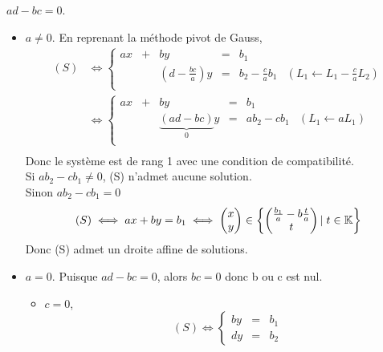 \documentclass{article}
\begin{document}
\begin{question_kholle}
		\item $ad - bc = 0$.
		\begin{itemize}[label=$\bullet$ Supposons]
			\item $a \neq 0$. En reprenant la méthode pivot de Gauss,
			\begin{equation*}
				\begin{aligned}
					(S)
					&\iff \left\{
					\begin{array}{cccccc}
						ax &+& by &=& b_1 \\
						&&\left(d - \frac{bc}{a}\right)y &=& b_2 - \frac{c}{a} b_1 &(L_1 \leftarrow L_1 - \frac{c}{a} L_2) \\
					\end{array}
					\right. \\
					&\iff \left\{
					\begin{array}{cccccc}
						ax &+& by &=& b_1 \\
						&& \underbrace{\left(ad - bc\right)}_0 y &=& a b_2 - c b_1 &(L_1 \leftarrow aL_1) \\
					\end{array}
					\right. \\
				\end{aligned}
			\end{equation*}
			Donc le système est de rang 1 avec une condition de compatibilité. \\
			Si $ab_2 - cb_1 \neq 0$, (S) n'admet aucune solution. \\
			Sinon $ab_2 - cb_1 = 0$
			\begin{equation}
				(S) \iff
				ax + by = b_1 \iff
				\begin{pmatrix} x \\ y \end{pmatrix} \in \left\{
					\begin{pmatrix} \frac{b_1}{a} - b\frac{t}{a} \\ t \end{pmatrix}
					|\; t \in \mathbb K
				\right\}
			\end{equation}
			Donc (S) admet un droite affine de solutions.
			
			\item $a = 0$. Puisque $ad - bc = 0$, alors $bc = 0$ donc b ou c est nul.
			
			\begin{itemize}[label=$\bullet$ Si]
				\item $c = 0$,
				\begin{equation*}
					(S) \iff
					\left\{ \begin{array}{ccc}
							by &=& b_1 \\
							dy &=& b_2
					\end{array} \right.
				\end{equation*}
				

\end{itemize}
\end{itemize}
\end{question_kholle}
\end{document}
